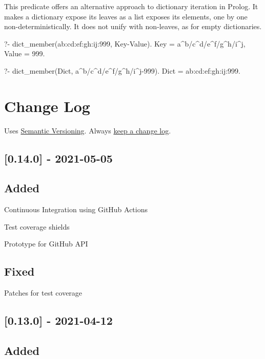 This predicate offers an alternative approach to dictionary iteration in
Prolog. It makes a dictionary expose its leaves as a list exposes its
elements, one by one non-deterministically. It does not unify with
non-leaves, as for empty dictionaries.

\begin{code}
?- dict_member(a{b:c{d:e{f:g{h:i{j:999}}}}}, Key-Value).
Key = a^b/c^d/e^f/g^h/i^j,
Value = 999.

?- dict_member(Dict, a^b/c^d/e^f/g^h/i^j-999).
Dict = a{b:c{d:e{f:g{h:i{j:999}}}}}.
\end{code}

\chapter{Change Log}

Uses \href{https://semver.org/}{Semantic Versioning}. Always \href{https://keepachangelog.com/en/1.0.0/}{keep a change
log}.

\section{[0.14.0] - 2021-05-05}

\section{Added}

\begin{shortlist}
    \item Continuous Integration using GitHub Actions
    \item Test coverage shields
    \item Prototype for GitHub API
\end{shortlist}

\section{Fixed}

\begin{shortlist}
    \item Patches for test coverage
\end{shortlist}

\section{[0.13.0] - 2021-04-12}

\section{Added}

